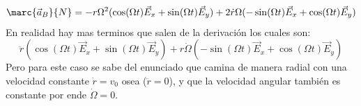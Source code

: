 \begin{tcolorbox}[colframe=black!50!white, %
        title= Solucion Hormiga Velocista (Definición), breakable]
$$\marc{\vec{a}_B}{N}=-r\Omega^2(\cos(\Omega t)\vec{E}_x+\sin(\Omega t)\vec{E}_y)+2\dot{r}\Omega(-\sin(\Omega t)\vec{E}_x+\cos(\Omega t)\vec{E}_y)$$
En realidad hay mas terminos que salen de la derivación los cuales son:
$$\ddot{r}(\cos(\Omega t)\vec{E}_x+\sin(\Omega t)\vec{E}_y)+r\dot{\Omega}(-\sin(\Omega t)\vec{E}_x+\cos(\Omega t)\vec{E}_y)$$
Pero para este caso se sabe del enunciado que camina de manera radial con una velocidad constante $\dot{r}=v_0$ osea ($\ddot{r}=0$), y que la velocidad angular también es constante por ende $\dot{\Omega}=0$.
\end{tcolorbox}